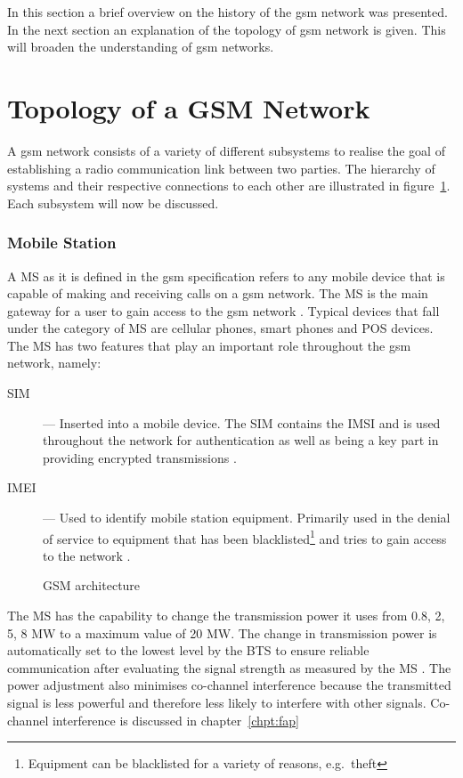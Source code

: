 In this section a brief overview on the history of the \gls{gsm} network was presented. In the next section an explanation of the topology of \gls{gsm} network is given. This will broaden the understanding of \gls{gsm} networks.
\section{Topology of a GSM Network}
\label{sec:GSMArch}
A \gls{gsm} network consists of a variety of different subsystems to realise the goal of establishing a radio communication link between two parties. The hierarchy of systems and their respective connections to each other are illustrated in figure~\ref{fig:GSMArchitecture}. Each subsystem will now be discussed.

\subsubsection{Mobile Station}
A \gls{MS}  as it is defined in the \gls{gsm} specification refers to any mobile device that is capable of making and receiving calls on a \gls{gsm} network.  The \gls{MS} is the main gateway 
for a user to gain access to the \gls{gsm} network \cite{Eisenblatter,GSMArchitectureProtocolsServices}. Typical devices that fall under the category of \gls{MS} are cellular phones, smart phones and \gls{POS} devices. The \gls{MS} has two features that play an important role throughout the \gls{gsm} network, namely:
\begin{description}
  \item[\Gls{SIM}] --- Inserted into a mobile device. The \gls{SIM} contains the \gls{IMSI} and is used throughout the network for authentication as well as being a key part in providing encrypted transmissions \cite{Eisenblatter}.
\item[\Gls{IMEI}] --- Used to identify mobile station equipment. Primarily used in the denial of service to equipment that has been blacklisted\footnote{Equipment can be blacklisted for a variety of reasons, e.g.\ theft} and tries to gain access to the network \cite{Eisenblatter}.
\end{description}
\begin{figure}[H]
	\begin{centering}
		
		\caption{GSM architecture\cite{GSMArchitectureProtocolsServices}}
		\label{fig:GSMArchitecture}
	\end{centering}
\end{figure}
The \gls{MS} has the capability to change the transmission power it uses from 0.8, 2, 5, 8 MW to a maximum value of 20 MW\cite{GSMSysEngin}. The change in transmission power is automatically set to the lowest level by the \gls{BTS} to ensure reliable communication after evaluating the signal strength as measured by the \gls{MS} \cite{GSMSysEngin,GSMArchitectureProtocolsServices}. The power adjustment also minimises co-channel interference because the transmitted signal is less powerful and therefore less likely to interfere with other signals\cite{GSMSysEngin}. Co-channel interference is discussed in chapter~\ref{chpt:fap}

